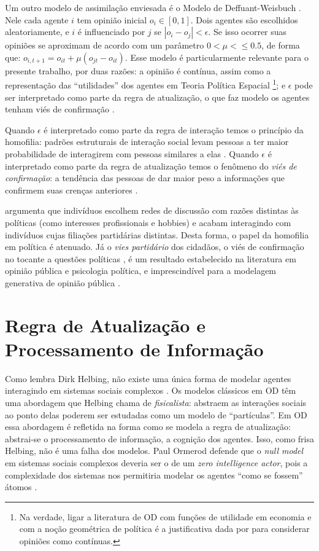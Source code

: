   Um outro modelo de assimilação enviesada é o Modelo de Deffuant-Weisbuch
  \cite{deffuant2000mixing}. Nele cada agente \(i\) tem opinião inicial \( o_i \in
  [0,1]\). Dois agentes são escolhidos aleatoriamente, e \(i\) é influenciado
  por \(j\) se \(| o_i - o_j| < \epsilon\). Se isso ocorrer suas opiniões se aproximam
  de acordo com um parâmetro $0 < \mu< \leq 0.5$, de forma que: $o_{i,t+1} = o_{it} +
  \mu(o_{jt} - o_{it})$. Esse modelo é particularmente relevante para o presente
  trabalho, por duas razões: a opinião é contínua, assim como a representação
  das ``utilidades'' dos agentes em Teoria Política Espacial \footnote{Na
    verdade, ligar a literatura de OD com funções de utilidade em economia e com
    a noção geométrica de política é a justificativa dada por
     para considerar opiniões como contínuas.}; e
  \(\epsilon\) pode ser interpretado como parte da regra de atualização, o que faz
  modelo os agentes tenham viés de confirmação \cite{flache2017}.

Quando \(\epsilon\) é interpretado como parte da regra de interação temos o princípio
da homofilia: padrões estruturais de interação social levam pessoas a ter maior
probabilidade de interagirem com pessoas similares a elas
\cite{mcpherson2001birds}. Quando \(\epsilon\) é interpretado como parte da regra de
atualização temos o fenômeno do \textit{viés de confirmação}: a tendência das
pessoas de dar maior peso a informações que confirmem suas crenças anteriores
\cite{nickerson1998confirmation}.

 argumenta que indivíduos escolhem redes de
discussão com razões distintas às políticas (como interesses profissionais e
hobbies) e acabam interagindo com indivíduos cujas filiações partidárias
distintas. Desta forma, o papel da homofilia em política é atenuado. Já o
\textit{vies partidário} dos cidadãos, o viés de confirmação no tocante a
questões políticas , é um resultado estabelecido na literatura em opinião
pública e psicologia política, e imprescindível para a modelagem generativa de
opinião pública \cite{bartels2002beyond, flynn2017nature,
  lodge2013rationalizing}.


\section{Regra de Atualização e Processamento de Informação}


Como lembra Dirk Helbing, não existe uma única forma de modelar agentes
interagindo em sistemas sociais complexos \cite{helbing2010pluralistic}. Os
modelos clássicos em OD têm uma abordagem que Helbing chama de
\textit{fisicalista}: abstraem as interações sociais ao ponto delas poderem ser
estudadas como um modelo de ``partículas''. Em OD essa abordagem é refletida na
forma como se modela a regra de atualização: abstrai-se o processamento de
informação, a cognição dos agentes. Isso, como frisa Helbing, não é uma falha
dos modelos. Paul Ormerod defende que o \textit{null model} em sistemas sociais
complexos deveria ser o de um \textit{zero intelligence actor}, pois a
complexidade dos sistemas nos permitiria modelar os agentes ``como se fossem''
átomos \cite{ormerod2008can, bentley2012agents}.

